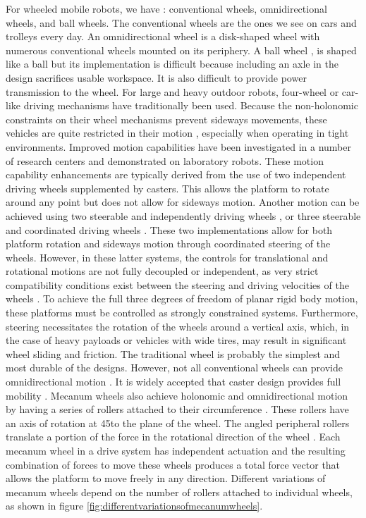 For wheeled mobile robots, we have \cite{muir_kinematic_1987}: conventional wheels, omnidirectional wheels, and ball wheels.
The conventional wheels are the ones we see on cars and trolleys every day.
An omnidirectional wheel is a disk-shaped wheel with numerous conventional wheels mounted on its periphery.
A ball wheel \cite{ostrovskaya_dynamics_2000}, \cite{west_design_1995} is shaped like a ball but its implementation is difficult because including an axle in the design sacrifices usable workspace.
It is also difficult to provide power transmission to the wheel.
For large and heavy outdoor robots, four-wheel or car-like driving mechanisms have traditionally been used.
Because the non-holonomic constraints on their wheel mechanisms prevent sideways movements, these vehicles are quite restricted in their motion \cite{laumond_feasible_1986}\cite{pin_autonomous_1990}\cite{noauthor_navigation_nodate}, especially when operating in tight environments.
Improved motion capabilities have been investigated in a number of research centers and demonstrated on laboratory robots.
These motion capability enhancements are typically derived from the use of two independent driving wheels supplemented by casters.
This allows the platform to rotate around any point but does not allow for sideways motion.
Another motion can be achieved using two steerable and independently driving wheels \cite{pin_autonomous_1989}, or three steerable and coordinated driving wheels \cite{pin_autonomous_1989}.
These two implementations allow for both platform rotation and sideways motion through coordinated steering of the wheels.
However, in these latter systems, the controls for translational and rotational motions are not fully decoupled or independent, as very strict compatibility conditions exist between the steering and driving velocities of the wheels \cite{alexander_kinematics_1989}.
To achieve the full three degrees of freedom of planar rigid body motion, these platforms must be controlled as strongly constrained systems.
Furthermore, steering necessitates the rotation of the wheels around a vertical axis, which, in the case of heavy payloads or vehicles with wide tires, may result in significant wheel sliding and friction.
The traditional wheel is probably the simplest and most durable of the designs. However, not all conventional wheels can provide omnidirectional motion \cite{muir_kinematic_1987} \cite{alexander_kinematics_1989} \cite{ostrovskaya_nonholonomic_1998}. It is widely accepted that caster design provides full mobility \cite{d39_structural_1996}.
Mecanum wheels also achieve holonomic and omnidirectional motion by having a series of rollers attached to their circumference \cite{diegel_improved_nodate}.
These rollers have an axis of rotation at 45\degree to the plane of the wheel.
The angled peripheral rollers translate a portion of the force in the rotational direction of the wheel \cite{diegel_improved_nodate}.
Each mecanum wheel in a drive system has independent actuation and the resulting combination of forces to move these wheels produces a total force vector that allows the platform to move freely in any direction.
Different variations of mecanum wheels depend on the number of rollers attached to individual wheels, as shown in figure \ref{fig:differentvariationsofmecanumwheels}.


